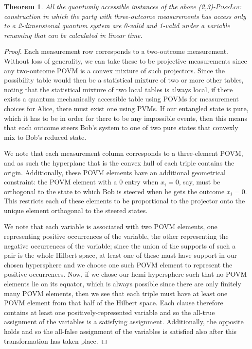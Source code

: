 \documentclass[reprint]{revtex4-1}
\newtheorem{thm}{Theorem}
\theoremstyle{definition}
\begin{document}
\begin{thm}
All the quantumly accessible instances of the above \textsc{(2,3)-PossLoc} construction in which the party with three-outcome measurements has access only to a 2-dimensional quantum system are 0-valid and 1-valid under a variable renaming that can be calculated in linear time.
\end{thm}
\begin{proof}
Each measurement row corresponds to a two-outcome measurement. Without loss of generality, we can take these to be projective measurements since any two-outcome POVM is a convex mixture of such projectors. Since the possibility table would then be a statistical mixture of two or more other tables, noting that the statistical mixture of two local tables is always local, if there exists a quantum mechanically accessible table using POVMs for measurement choices for Alice, there must exist one using PVMs. If our entangled state is pure, which it has to be in order for there to be any impossible events, then this means that each outcome steers Bob's system to one of two pure states that convexly mix to Bob's reduced state.

We note that each measurement column corresponds to a three-element POVM, and as such the hyperplane that is the convex hull of each triple contains the origin. Additionally, these POVM elements have an additional geometrical constraint: the POVM element with a 0 entry when $x_i=0$, say, must be orthogonal to the state to which Bob is steered when he gets the outcome $x_i=0$. This restricts each of these elements to be proportional to the projector onto the unique element orthogonal to the steered states.

We note that each variable is associated with two POVM elements, one representing positive occurrences of the variable, the other representing the negative occurrences of the variable; since the union of the supports of such a pair is the whole Hilbert space, at least one of these must have support in our chosen hypersphere and we choose one such POVM element to represent the positive occurrences. Now, if we chose our hemi-hypersphere such that no POVM elements lie on its equator, which is always possible since there are only finitely many POVM elements, then we see that each triple must have at least one POVM element from that half of the Hilbert space. Each clause therefore contains at least one positively-represented variable and so the all-true assignment of the variables is a satisfying assignment. Additionally, the opposite holds and so the all-false assignment of the variables is satisfied also after this transformation has taken place. %
\end{proof}
\end{document}

